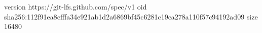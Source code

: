 version https://git-lfs.github.com/spec/v1
oid sha256:112f91ea8cfffa34e921ab1d2a6869bf45c6281c19ca278a110f57c94192ad09
size 16480
